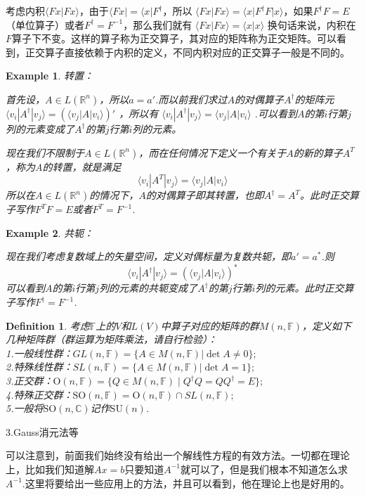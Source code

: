 \documentclass[11pt,a4paper,openany]{book}%
\theoremstyle{plain}%
\newtheorem{defi}{Definition}[chapter]%
\newtheorem{exa}{Example}[chapter]%
\begin{document}
考虑内积$\langle Fx|Fx \rangle$，由于$\langle Fx|=\langle x|F^\dag$，所以
$\langle Fx|Fx \rangle=\langle x|F^\dag F|x \rangle$，如果$F^\dag F=E$（单位算子）或者$F^\dag=F^{-1}$，那么我们就有
$
\langle Fx|Fx \rangle=\langle x|x \rangle
$
换句话来说，内积在$F$算子下不变。这样的算子称为正交算子，其对应的矩阵称为正交矩阵。可以看到，正交算子直接依赖于内积的定义，不同内积对应的正交算子一般是不同的。
\begin{exa}转置：

首先设，$A\in L(\mathbb{R}^n)$，所以$a=a'$.而以前我们求过$A$的对偶算子$A^\dag$的矩阵元
$
\langle v_i|A^\dag|v_j \rangle=(\langle v_j|A|v_i \rangle)'
$
，所以有
$
\langle v_i|A^\dag|v_j \rangle=\langle v_j|A|v_i \rangle
$
.可以看到$A$的第$i$行第$j$列的元素变成了$A^\dag$的第$j$行第$i$列的元素。

现在我们不限制于$A\in L(\mathbb{R}^n)$，而在任何情况下定义一个有关于$A$的新的算子$A^T$，称为A的转置，就是满足
\[
\langle v_i|A^T|v_j \rangle=\langle v_j|A|v_i \rangle
\]
所以在$A\in L(\mathbb{R}^n)$的情况下，$A$的对偶算子即其转置，也即$A^\dag=A^T$。此时正交算子写作$F^T F=E$或者$F^T=F^{-1}$.
\end{exa}
\begin{exa}共轭：

现在我们考虑复数域上的矢量空间，定义对偶标量为复数共轭，即$a'=a^*$.则
\[
\langle v_i|A^\dag|v_j \rangle=(\langle v_j|A|v_i \rangle)^*
\]
可以看到$A$的第$i$行第$j$列的元素的共轭变成了$A^\dag$的第$j$行第$i$列的元素。此时正交算子写作$F^\dag=F^{-1}$.
\end{exa}
\begin{defi}
考虑$\mathbb{F}$上的$V$和$L(V)$中算子对应的矩阵的群$M(n,\mathbb{F})$，定义如下几种矩阵群（群运算为矩阵乘法，请自行检验）：\\
1.一般线性群：$GL(n,\mathbb{F})=\{A\in M(n,\mathbb{F})|\det A\neq 0\};$\\
2.特殊线性群：$SL(n,\mathbb{F})=\{A\in M(n,\mathbb{F})|\det A=1\};$\\
3.正交群：$\mathrm{O}(n,\mathbb{F}) = \{ Q \in M(n,\mathbb{F}) \mid Q^\dag Q = Q Q^\dag = E \};$\\
4.特殊正交群：$\mathrm{SO}(n,\mathbb{F}) =\mathrm{O}(n,\mathbb{F})\cap SL(n,\mathbb{F});$\\
5.一般将$\mathrm{SO}(n,\mathbb{C}) $记作$\mathrm{SU}(n)$.
\end{defi}
\noindent 3.Gauss消元法等

可以注意到，前面我们始终没有给出一个解线性方程的有效方法。一切都在理论上，比如我们知道解$Ax=b$只要知道$A^{-1}$就可以了，但是我们根本不知道怎么求$A^{-1}$.这里将要给出一些应用上的方法，并且可以看到，他在理论上也是好用的。
\end{document}
